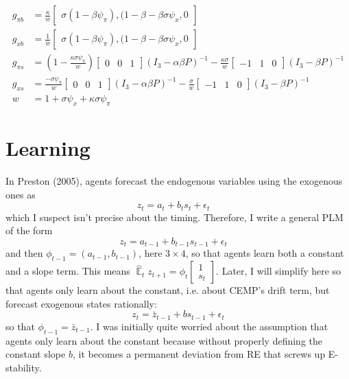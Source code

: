 \documentclass[11pt]{article}
\renewcommand{\[}{\begin{equation}}
\renewcommand{\]}{\end{equation}}
\DeclareMathOperator{\E}{\mathbb{E}}
\begin{document}
\begin{align}
g_{\pi b} & = \frac{\kappa}{w} \begin{bmatrix}\sigma(1-\beta\psi_{\pi}), (1-\beta-\beta\sigma\psi_x, 0 \end{bmatrix}\\
g_{x b} & = \frac{1}{w} \begin{bmatrix}\sigma(1-\beta\psi_{\pi}), (1-\beta-\beta\sigma\psi_x, 0 \end{bmatrix} \\
g_{\pi s} & = (1-\frac{\kappa\sigma\psi_{\pi}}{w} )\begin{bmatrix} 0&0&1 \end{bmatrix} (I_3 - \alpha\beta P)^{-1} -\frac{\kappa\sigma}{w}\begin{bmatrix} -1&1&0 \end{bmatrix} (I_3 -\beta P)^{-1}\\
g_{x s} & =  \frac{-\sigma\psi_{\pi}}{w} \begin{bmatrix} 0&0&1 \end{bmatrix}(I_3 - \alpha\beta P)^{-1}  -\frac{\sigma}{w}\begin{bmatrix} -1&1&0 \end{bmatrix}(I_3 -\beta P)^{-1}\\
w & = 1+\sigma\psi_x +\kappa\sigma\psi_{\pi}
\end{align}
\clearpage

 \section{Learning}

In Preston (2005), agents forecast the endogenous variables using the exogenous ones as
\begin{equation}
z_t = a_{t} + b_{t} s_{t} + \epsilon_t \quad  \tag{Preston, p. 101}
\end{equation}
which I suspect isn't precise about the timing. Therefore, I write a general PLM of the form
\begin{equation}
z_t = a_{t-1} + b_{t-1} s_{t-1} + \epsilon_t \quad  \label{generalPLM}
\end{equation}
and then $\phi_{t-1} = (a_{t-1}, b_{t-1})$, here $3\times4$, so that agents learn both a constant and a slope term. This means $\hat{\E}_t z_{t+1} = \phi_{t}\begin{bmatrix} 1 \\ s_{t} \end{bmatrix} $. Later, I will simplify here so that agents only learn about the constant, i.e. about CEMP's drift term, but forecast exogenous states rationally:
\begin{equation}
z_t = \bar{z}_{t-1} + bs_{t-1} + \epsilon_t \label{PLM_constant}  
\end{equation}
so that $\phi_{t-1} = \bar{z}_{t-1}$. I was initially quite worried about the assumption that agents only learn about the constant because without properly defining the constant slope $b$, it becomes a permanent deviation from RE that screws up E-stability.
\end{document}
